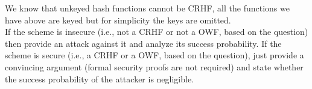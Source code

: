 \documentclass[12pt]{article}
\begin{document}
 We know that unkeyed hash functions cannot be CRHF, all the functions we have above are keyed but for simplicity the keys are omitted. \\

 If the scheme is insecure (i.e., not a CRHF or not a OWF, based on the question) then provide an attack against it and analyze its success probability. If the scheme is secure (i.e., a CRHF or a OWF, based on the question), just provide a convincing argument (formal security proofs are not required) and state whether the success probability of the attacker is negligible. \\
\end{document}
